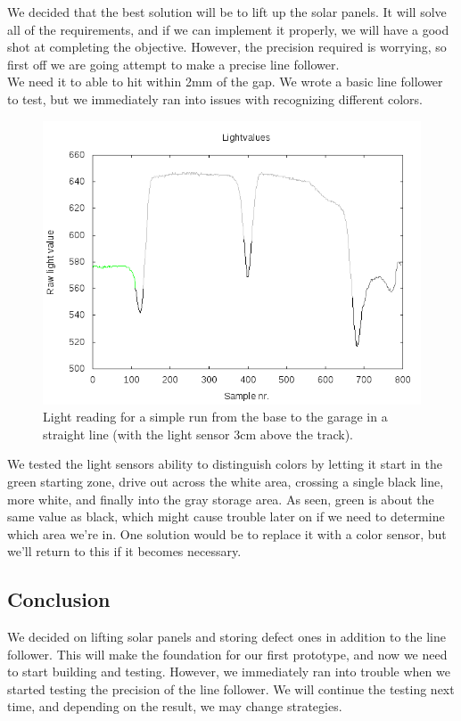 We decided that the best solution will be to lift up the solar panels.
It will solve all of the requirements, and if we can implement it
properly, we will have a good shot at completing the objective. However,
the precision required is worrying, so first off we are going attempt to
make a precise line follower.\\We need it to able to hit within 2mm of
the gap. We wrote a basic line follower to test, but we immediately ran
into issues with recognizing different
colors.\\
\begin{figure}[hpt]
  \centering
  \includegraphics[scale=0.5]{../experiments/1prototype/results/gnuplot/GridAccuracy3cm_color.png}
  \caption{Light reading for a simple run from the base to the garage in a straight line (with the light sensor 3cm above the track).}
\end{figure}
We tested the light sensors ability to distinguish colors by letting it
start in the green starting zone, drive out across the white area,
crossing a single black line, more white, and finally into the gray
storage area. As seen, green is about the same value as black, which
might cause trouble later on if we need to determine which area we're
in. One solution would be to replace it with a color sensor, but we'll
return to this if it becomes necessary.

\subsection{Conclusion}

We decided on lifting solar panels and storing defect ones in addition
to the line follower. This will make the foundation for our first
prototype, and now we need to start building and testing. However, we
immediately ran into trouble when we started testing the precision of
the line follower. We will continue the testing next time, and depending
on the result, we may change strategies.
